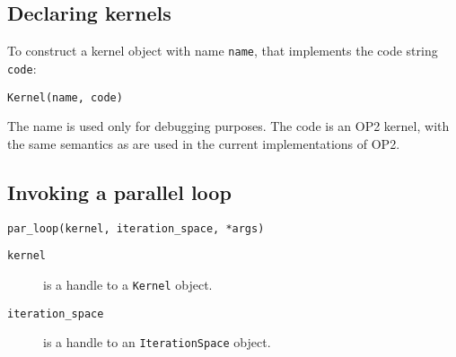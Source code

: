 \documentclass[a4paper]{article}
\begin{document}
\subsection{Declaring kernels}

To construct a kernel object with name \verb|name|, that implements the code string \verb|code|:

\begin{verbatim}
Kernel(name, code)
\end{verbatim}

The name is used only for debugging purposes. The code is an OP2 kernel, with the same semantics as are used in the current implementations of OP2.

\subsection{Invoking a parallel loop}

\begin{verbatim}
par_loop(kernel, iteration_space, *args)
\end{verbatim}

\begin{description}
  \item[\texttt{kernel}] is a handle to a \verb|Kernel| object.
  \item[\texttt{iteration\_space}] is a handle to an \verb|IterationSpace| object.
\end{description}
\end{document}
